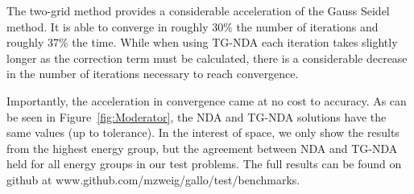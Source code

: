 The two-grid method provides a considerable acceleration of the Gauss Seidel method. It is able to converge in roughly 30\% the number of iterations and roughly 37\% the time. While when using TG-NDA each iteration takes slightly longer as the correction term must be calculated, there is a considerable decrease in the number of iterations necessary to reach convergence. 

Importantly, the acceleration in convergence came at no cost to accuracy. As can be seen in Figure~\ref{fig:Moderator}, the NDA and TG-NDA solutions have the same values (up to tolerance). In the interest of space, we only show the results from the highest energy group, but the agreement between NDA and TG-NDA held for all energy groups in our test problems. The full results can be found on github at www.github.com/mzweig/gallo/test/benchmarks.

